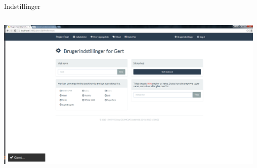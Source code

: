 \begin{frame}{Indstillinger}

	
	\begin{minipage}[0.3\textheight]{\textwidth}
	\begin{columns}[T]
	\begin{column}{1\textwidth}
	 \includegraphics[width=1\textwidth,height=1\textheight,keepaspectratio, trim={1cm 0 0 16mm}, clip]{images/Screenshots/Settings.png}
	
	\end{column}

	\end{columns}

  \end{minipage}
	
\end{frame}
